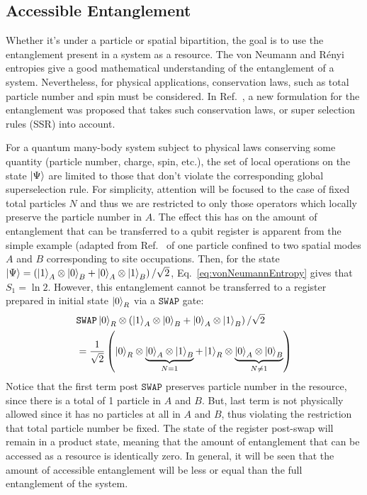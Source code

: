 	\subsection{Accessible Entanglement}
	Whether it's under a particle or spatial bipartition, the goal is to use the entanglement present in a system as a resource. The von Neumann and R\'enyi entropies give a good mathematical understanding of the entanglement of a system. Nevertheless, for physical applications, conservation laws, such as total particle number and spin must be considered. In Ref.~\cite{Wiseman:2003jx}, a new formulation for the entanglement was proposed that takes such conservation laws, or super selection rules (SSR) into account. 
	
	For a quantum many-body system subject to physical laws conserving some quantity (particle number, charge, spin, etc.), the set of local operations on the state $\ket{\Psi}$ are limited to those that don't violate the corresponding global superselection rule.  For simplicity, attention will be focused to the case of fixed total particles $N$ and thus we are restricted to only those operators which locally preserve the particle number in $A$.  The effect this has on the amount of entanglement that can be transferred to a qubit register is apparent from the simple example (adapted from Ref.~\cite{Wiseman:2003jx} of one particle confined to two spatial modes $A$ and $B$ corresponding to site occupations.  Then, for the state $\ket{\Psi} = \left(\ket{1}_A \otimes \ket{0}_{B} + \ket{0}_A \otimes \ket{1}_{B} \right)/\sqrt{2}$, Eq.~\eqref{eq:vonNeumannEntropy} gives that $S_1 = \ln 2$. However, this entanglement cannot be transferred to a register prepared in initial state $\ket{0}_R$ via a $\texttt{SWAP}$ gate:
\begin{align*}
    & \texttt{SWAP} \ket{0}_R\otimes\left(\ket{1}_A \otimes
    \ket{0}_{B} + \ket{0}_A \otimes \ket{1}_{B} \right)/\sqrt{2} \\
    &= \frac{1}{\sqrt{2}}\left( \ket{0}_R \otimes \underbrace{\ket{0}_A \otimes
        \ket{1}_{B}}_{N=1} + \ket{1}_R \otimes \underbrace{\ket{0}_A \otimes
    \ket{0}_{B}}_{N\neq1} \right)
\end{align*}
Notice that the first term post $\texttt{SWAP}$ preserves particle number in the resource, since there is a total of 1 particle in $A$ and $B$. But, last term is not physically allowed since it has no particles at all in $A$ and $B$, thus violating the restriction that total particle number be fixed. The state of the register post-swap will remain in a product state, meaning that the amount of entanglement that can be accessed as a resource is identically zero. In general, it will be seen that the amount of accessible entanglement will be less or equal than the full entanglement of the system.

